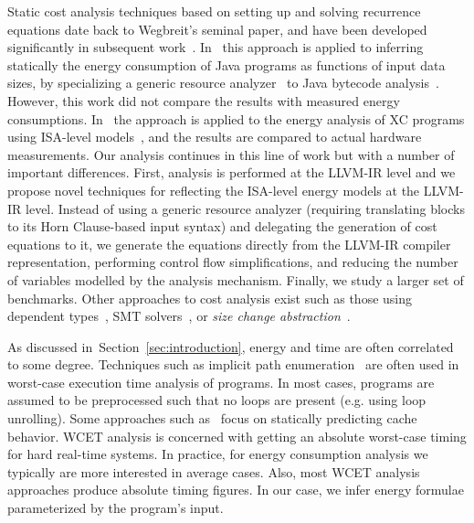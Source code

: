 \documentclass[9pt,preprint]{sigplanconf}
\newcommand{\secref}[1]{Section~\ref{sec:#1}}
\begin{document}
Static cost analysis techniques based on setting up and solving recurrence
equations date back to Wegbreit's \cite{DBLP:journals/cacm/Wegbreit75} seminal
paper, and have been developed significantly in subsequent
work~\cite{Rosendahl89, granularity, low-bounds-ilps97, vh-03, resource-iclp07,
AlbertAGP11a}. In~\cite{NMHLFM08} this approach is applied to inferring
statically the energy consumption of Java programs as functions of input data
sizes, by specializing a generic resource analyzer~\cite{resource-iclp07,
ciaopp-sas03-journal-scp} to Java bytecode analysis~\cite{resources-bytecode09}.
However, this work did not compare the results with measured energy
consumptions.  In~\cite{isa-energy-lopstr13} the approach is applied to the
energy analysis of XC programs using ISA-level models~\cite{Kerrison13}, and the
results are compared to actual hardware measurements.  Our analysis continues in
this line of work but with a number of important differences.  First, analysis
is performed at the LLVM-IR level and we propose novel techniques for reflecting
the ISA-level energy models at the LLVM-IR level.  Instead of using a
generic resource analyzer (requiring translating blocks to its Horn Clause-based
input syntax) and delegating the generation of cost equations to it, we generate
the equations directly from the LLVM-IR compiler representation, performing
control flow simplifications, and reducing the number of variables modelled by
the analysis mechanism.  Finally, we study a larger set of benchmarks.
Other approaches to cost analysis exist such as those using dependent
types~\cite{DBLP:journals/toplas/0002AH12}, SMT solvers~\cite{Alonso2012}, or
\emph{size change abstraction}~\cite{DBLP:journals/corr/abs-1203-5303}.

As discussed in~\secref{introduction}, energy and time are often correlated to
some degree. Techniques such as implicit path
enumeration~\cite{DBLP:conf/lctrts/LiM95} are often used in worst-case
execution time analysis of programs. In most cases, programs are assumed to be
preprocessed such that no loops are present (e.g. using loop unrolling). Some
approaches such as~\cite{DBLP:conf/vmcai/2009} focus on statically
predicting cache behavior. WCET analysis is concerned with getting an absolute
worst-case timing for hard real-time systems. In practice, for energy
consumption analysis we typically are more interested in average cases. Also,
most WCET analysis approaches produce absolute timing figures. In our case, we
infer energy formulae parameterized by the program's input.
\end{document}
